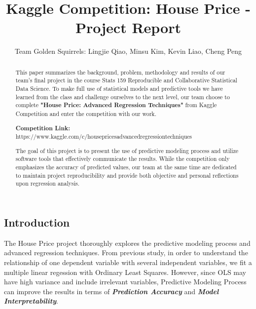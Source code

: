 \documentclass[a4paper]{article}
\title{Kaggle Competition: House Price - Project Report}
\author{Team Golden Squirrels: Lingjie Qiao, Minsu Kim, Kevin Liao, Cheng Peng}
\begin{document}

\maketitle

\begin{flushleft}
\begin{abstract}

This paper summarizes the background, problem, methodology and results of our team's final project in the course Stats 159 Reproducible and Collaborative Statistical Data Science. To make full use of statistical models and predictive tools we have learned from the class and challenge ourselves to the next level, our team choose to complete \textbf{"House Price: Advanced Regression Techniques"} from Kaggle Competition and enter the competition with our work. \newline

\textbf{Competition Link:} https://www.kaggle.com/c/house\hspace{0pt}prices\hspace{0pt}advanced\hspace{0pt}regression\hspace{0pt}techniques \newline

The goal of this project is to present the use of predictive modeling process and utilize software tools that effectively communicate the results. While the competition only emphasizes the accuracy of predicted values, our team at the same time are dedicated to maintain project reproducibility and provide both objective and personal reflections upon regression analysis. \newline
\end{abstract}

\section{Introduction}
The House Price project thoroughly explores the predictive modeling process and advanced regression techniques. From previous study, in order to understand the relationship of one dependent variable with several independent variables, we fit a multiple linear regession with Ordinary Least Squares. However, since OLS may have high variance and include irrelevant variables, Predictive Modeling Process can improve the results in terms of \textbf{\textit{Prediction Accuracy}} and \textbf{\textit{Model Interpretability}}. \newline


\end{flushleft}
\end{document}
